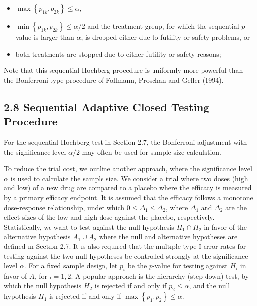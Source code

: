 \documentclass[10pt]{article}
\begin{document}
\begin{itemize}
  \item[(a)] $\max \left\{p_{1 k}, p_{2 k}\right\} \leq \alpha$,
  \item[(b)] $\min \left\{p_{1 k}, p_{2 k}\right\} \leq \alpha / 2$ and the treatment group, for which the sequential $p$ value is larger than $\alpha$, is dropped either due to futility or safety problems, or
  \item[(c)] both treatments are stopped due to either futility or safety reasons;
\end{itemize}

Note that this sequential Hochberg procedure is uniformly more powerful than the Bonferroni-type procedure of Follmann, Proschan and Geller (1994).

\subsection*{2.8 Sequential Adaptive Closed Testing Procedure}
For the sequential Hochberg test in Section 2.7, the Bonferroni adjustment with the significance level $\alpha / 2$ may often be used for sample size calculation.

To reduce the trial cost, we outline another approach, where the significance level $\alpha$ is used to calculate the sample size. We consider a trial where two doses (high and low) of a new drug are compared to a placebo where the efficacy is measured by a primary efficacy endpoint. It is assumed that the efficacy follows a monotone dose-response relationship, under which $0 \leq \Delta_{1} \leq \Delta_{2}$, where $\Delta_{1}$ and $\Delta_{2}$ are the effect sizes of the low and high dose against the placebo, respectively. Statistically, we want to test against the null hypothesis $H_{1} \cap H_{2}$ in favor of the alternative hypothesis $A_{1} \cup A_{2}$ where the null and alternative hypotheses are defined in Section 2.7. It is also required that the multiple type I error rates for testing against the two null hypotheses be controlled strongly at the significance level $\alpha$. For a fixed sample design, let $p_{i}$ be the $p$-value for testing against $H_{i}$ in favor of $A_{i}$ for $i=1,2$. A popular approach is the hierarchy (step-down) test, by which the null hypothesis $H_{2}$ is rejected if and only if $p_{2} \leq \alpha$, and the null hypothesis $H_{1}$ is rejected if and only if $\max \left\{p_{1}, p_{2}\right\} \leq \alpha$.
\end{document}
